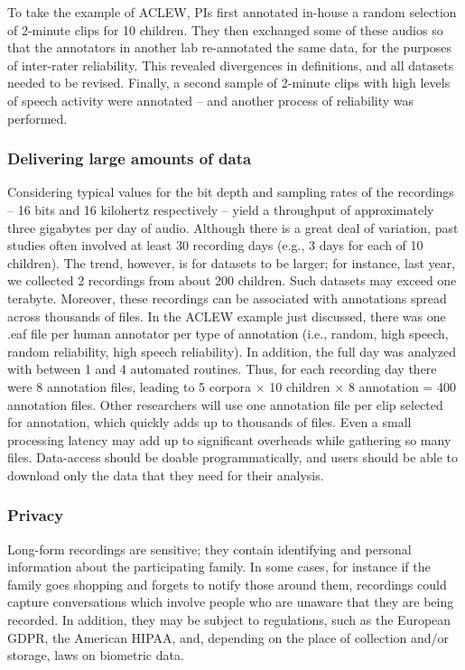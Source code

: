\documentclass[smallextended]{svjour3}       %
\begin{document}
To take the example of ACLEW, PIs first annotated in-house a random selection of 2-minute clips for 10 children. They then exchanged some of these audios so that the annotators in another lab re-annotated the same data, for the purposes of inter-rater reliability. This revealed divergences in definitions, and all datasets needed to be revised. Finally, a second sample of 2-minute clips with high levels of speech activity were annotated -- and another process of reliability was performed.

\subsubsection*{Delivering large amounts of data}

Considering typical values for the bit depth and sampling rates of the recordings -- 16 bits and 16 kilohertz respectively -- yield a throughput of approximately three gigabytes per day of audio. Although there is a great deal of variation, past studies often involved at least 30 recording days (e.g., 3 days for each of 10 children). The trend, however, is for datasets to be larger; for instance, last year, we collected 2 recordings from about 200 children. Such datasets may exceed one terabyte. Moreover, these recordings can be associated with annotations spread across thousands of files. In the ACLEW example just discussed, there was one .eaf file per human annotator per type of annotation (i.e., random, high speech, random reliability, high speech reliability). In addition, the full day was analyzed with between 1 and 4 automated routines. Thus, for each recording day there were 8 annotation files, leading to 5 corpora $\times$ 10 children $\times$ 8 annotation = 400 annotation files. Other researchers will use one annotation file per clip selected for annotation, which quickly adds up to thousands of files. Even a small processing latency may add up to significant overheads while gathering so many files. 
Data-access should be doable programmatically, and users should be able to download only the data that they need for their analysis.


\subsubsection*{Privacy}

Long-form recordings are sensitive; they contain identifying and personal information about the participating family. In some cases, for instance if the family goes shopping and forgets to notify those around them, recordings could capture conversations which involve people who are unaware that they are being recorded. In addition, they may be subject to regulations, such as the European GDPR, the American HIPAA, and, depending on the place of collection and/or storage, laws on biometric data.
\end{document}
